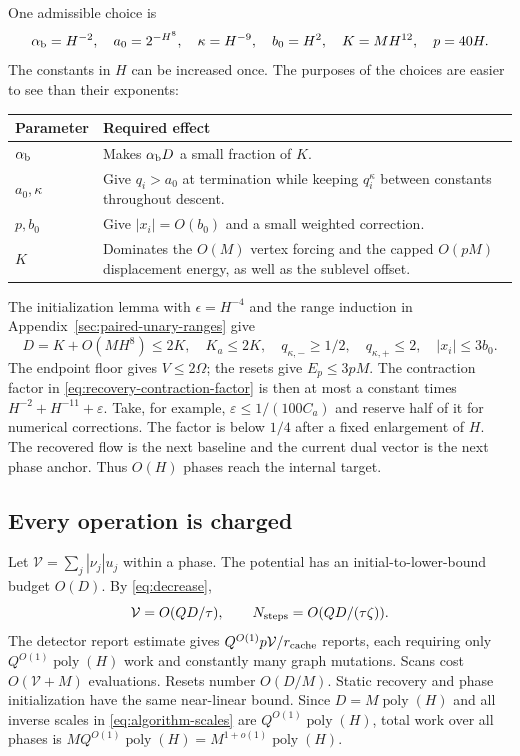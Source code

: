 \documentclass[11pt]{article}
\theoremstyle{definition}\newtheorem{definition}[theorem]{Definition}
\theoremstyle{remark}\newtheorem{remark}[theorem]{Remark}
\newcommand{\poly}{\operatorname{poly}}
\begin{document}
One admissible choice is
\begin{equation}\label{eq:parameter-choice}
 \alpha_{\rm b}=H^{-2},\quad a_0=2^{-H^8},\quad
 \kappa=H^{-9},\quad b_0=H^2,\quad K=MH^{12},\quad p=40H.
\end{equation}
The constants in $H$ can be increased once. The purposes of the choices
are easier to see than their exponents:
\begin{center}
\begin{tabular}{p{.24\linewidth}p{.66\linewidth}}
\toprule
Parameter & Required effect\\\midrule
$\alpha_{\rm b}$ & Makes $\alpha_{\rm b}D$ a small fraction of $K$.\\
$a_0,\kappa$ & Give $q_i>a_0$ at termination while keeping
$q_i^\kappa$ between constants throughout descent.\\
$p,b_0$ & Give $|x_i|=O(b_0)$ and a small weighted correction.\\
$K$ & Dominates the $O(M)$ vertex forcing and the capped $O(pM)$
displacement energy, as well as the sublevel offset.\\
\bottomrule
\end{tabular}
\end{center}
The initialization lemma with $\epsilon=H^{-4}$ and the range induction
in Appendix~\ref{sec:paired-unary-ranges} give
\[
 D=K+O(MH^8)\le2K,\quad K_a\le2K,\quad
 q_{\kappa,-}\ge1/2,\quad q_{\kappa,+}\le2,\quad |x_i|\le3b_0.
\]
The endpoint floor gives $V\le2\Omega$; the resets give
$E_p\le3pM$. The contraction factor in
\eqref{eq:recovery-contraction-factor} is then at most a constant
times $H^{-2}+H^{-11}+\varepsilon$. Take, for example,
$\varepsilon\le1/(100C_a)$ and reserve half of it for numerical
corrections. The factor is below $1/4$ after a fixed enlargement of $H$.
The recovered flow is the next baseline and the current dual vector is
the next phase anchor. Thus $O(H)$ phases reach the internal target.

\subsection{Every operation is charged}

Let $\mathcal V=\sum_j|\nu_j|u_j$ within a phase. The potential has
an initial-to-lower-bound budget $O(D)$. By \eqref{eq:decrease},
\[
 \mathcal V=O(QD/\tau),\qquad
 N_{\rm steps}=O(QD/(\tau\zeta)).
\]
The detector report estimate gives
$Q^{O(1)}p\mathcal V/r_{\rm cache}$ reports, each requiring only
$Q^{O(1)}\poly(H)$ work and constantly many graph mutations.
Scans cost $O(\mathcal V+M)$ evaluations. Resets number $O(D/M)$.
Static recovery and phase initialization have the same near-linear
bound. Since $D=M\poly(H)$ and all inverse scales in
\eqref{eq:algorithm-scales} are $Q^{O(1)}\poly(H)$, total work over
all phases is $MQ^{O(1)}\poly(H)=M^{1+o(1)}\poly(H)$.
\end{document}
